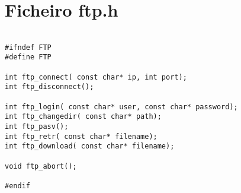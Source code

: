 \section{Ficheiro ftp.h}
\label{FTPH}

\begin{lstlisting}

#ifndef FTP
#define FTP

int ftp_connect( const char* ip, int port);
int ftp_disconnect();

int ftp_login( const char* user, const char* password);
int ftp_changedir( const char* path);
int ftp_pasv();
int ftp_retr( const char* filename);
int ftp_download( const char* filename);

void ftp_abort();

#endif

\end{lstlisting}